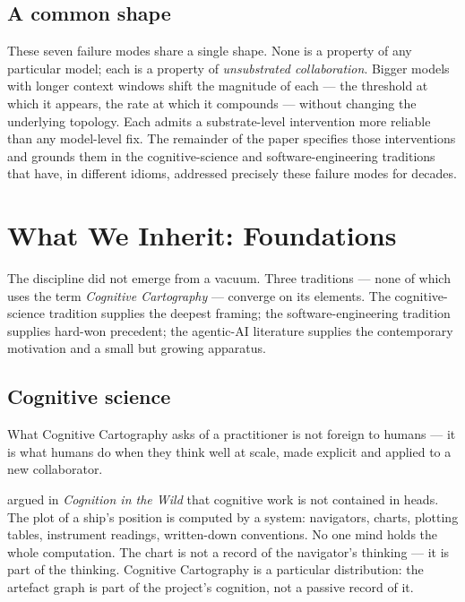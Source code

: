 \documentclass[11pt,a4paper,twocolumn]{article}
\begin{document}
\subsection*{A common shape}
These seven failure modes share a single shape. None is a property
of any particular model; each is a property of \emph{unsubstrated
collaboration}. Bigger models with longer context windows shift
the magnitude of each --- the threshold at which it appears, the
rate at which it compounds --- without changing the underlying
topology. Each admits a substrate-level intervention more reliable
than any model-level fix. The remainder of the paper specifies
those interventions and grounds them in the cognitive-science and
software-engineering traditions that have, in different idioms,
addressed precisely these failure modes for decades.

\section{What We Inherit: Foundations}
\label{sec:foundations}

The discipline did not emerge from a vacuum. Three traditions ---
none of which uses the term \emph{Cognitive Cartography} --- converge
on its elements. The cognitive-science tradition supplies the
deepest framing; the software-engineering tradition supplies hard-won
precedent; the agentic-AI literature supplies the contemporary
motivation and a small but growing apparatus.

\subsection{Cognitive science}

What Cognitive Cartography asks of a practitioner is not foreign to
humans --- it is what humans do when they think well at scale, made
explicit and applied to a new collaborator.

\citet{hutchins1995} argued in \emph{Cognition in the Wild} that
cognitive work is not contained in heads. The plot of a ship's
position is computed by a system: navigators, charts, plotting
tables, instrument readings, written-down conventions. No one mind
holds the whole computation. The chart is not a record of the
navigator's thinking --- it is part of the thinking. Cognitive
Cartography is a particular distribution: the artefact graph is
part of the project's cognition, not a passive record of it.
\end{document}
